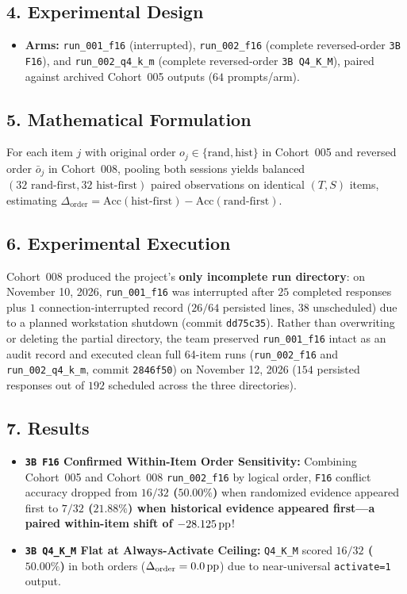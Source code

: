\subsection*{4. Experimental Design}
\begin{itemize}
  \item \textbf{Arms:} \texttt{run\_001\_f16} (interrupted), \texttt{run\_002\_f16} (complete reversed-order \texttt{3B F16}), and \texttt{run\_002\_q4\_k\_m} (complete reversed-order \texttt{3B Q4\_K\_M}), paired against archived Cohort~005 outputs ($64$ prompts/arm).
\end{itemize}

\subsection*{5. Mathematical Formulation}
For each item $j$ with original order $o_j \in \{\mathrm{rand}, \mathrm{hist}\}$ in Cohort~005 and reversed order $\bar{o}_j$ in Cohort~008, pooling both sessions yields balanced $(32\text{ rand-first}, 32\text{ hist-first})$ paired observations on identical $(T,S)$ items, estimating $\Delta_{\mathrm{order}} = \mathrm{Acc}(\mathrm{hist\text{-}first}) - \mathrm{Acc}(\mathrm{rand\text{-}first})$.

\subsection*{6. Experimental Execution}
Cohort~008 produced the project's \textbf{only incomplete run directory}: on November 10, 2026, \texttt{run\_001\_f16} was interrupted after $25$ completed responses plus $1$ connection-interrupted record ($26/64$ persisted lines, $38$ unscheduled) due to a planned workstation shutdown (commit \texttt{dd75c35}). Rather than overwriting or deleting the partial directory, the team preserved \texttt{run\_001\_f16} intact as an audit record and executed clean full 64-item runs (\texttt{run\_002\_f16} and \texttt{run\_002\_q4\_k\_m}, commit \texttt{2846f50}) on November 12, 2026 ($154$ persisted responses out of $192$ scheduled across the three directories).

\subsection*{7. Results}
\begin{itemize}
  \item \textbf{\texttt{3B F16} Confirmed Within-Item Order Sensitivity:} Combining Cohort~005 and Cohort~008 \texttt{run\_002\_f16} by logical order, \texttt{F16} conflict accuracy dropped from \textbf{$16/32$ ($50.00\%$)} when randomized evidence appeared first to \textbf{$7/32$ ($21.88\%$)\textbf{ when historical evidence appeared first---a paired within-item shift of }$-28.125\,\mathrm{pp}$}!
  \item \textbf{\texttt{3B Q4\_K\_M} Flat at Always-Activate Ceiling:} \texttt{Q4\_K\_M} scored \textbf{$16/32$ ($50.00\%$)} in both orders ($\Delta_{\mathrm{order}} = 0.0\,\mathrm{pp}$) due to near-universal \texttt{activate=1} output.
\end{itemize}

